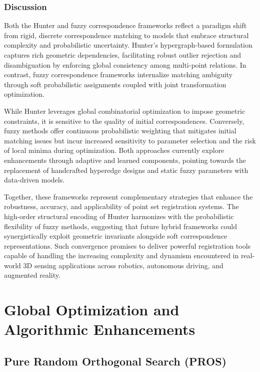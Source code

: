 \documentclass[sigconf]{acmart}
\begin{document}
\subsubsection{Discussion}

Both the Hunter and fuzzy correspondence frameworks reflect a paradigm shift from rigid, discrete correspondence matching to models that embrace structural complexity and probabilistic uncertainty. Hunter’s hypergraph-based formulation captures rich geometric dependencies, facilitating robust outlier rejection and disambiguation by enforcing global consistency among multi-point relations. In contrast, fuzzy correspondence frameworks internalize matching ambiguity through soft probabilistic assignments coupled with joint transformation optimization.

While Hunter leverages global combinatorial optimization to impose geometric constraints, it is sensitive to the quality of initial correspondences. Conversely, fuzzy methods offer continuous probabilistic weighting that mitigates initial matching issues but incur increased sensitivity to parameter selection and the risk of local minima during optimization. Both approaches currently explore enhancements through adaptive and learned components, pointing towards the replacement of handcrafted hyperedge designs and static fuzzy parameters with data-driven models.

Together, these frameworks represent complementary strategies that enhance the robustness, accuracy, and applicability of point set registration systems. The high-order structural encoding of Hunter harmonizes with the probabilistic flexibility of fuzzy methods, suggesting that future hybrid frameworks could synergistically exploit geometric invariants alongside soft correspondence representations. Such convergence promises to deliver powerful registration tools capable of handling the increasing complexity and dynamism encountered in real-world 3D sensing applications across robotics, autonomous driving, and augmented reality.

\section{Global Optimization and Algorithmic Enhancements}

\subsection{Pure Random Orthogonal Search (PROS)}
\end{document}
